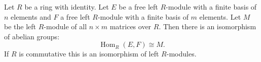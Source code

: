 Let $R$ be a ring with identity. Let $E$ be a free left $R$-module with a finite basis of $n$ elements and $F$ a free left $R$-module with a finite basis of $m$ elements. Let $M$ be the left $R$-module of all $n \times m$ matrices over $R$. Then there is an isomorphism of abelian groups:
\[
\operatorname{Hom}_R(E,F) \cong M.
\]
If $R$ is commutative this is an isomorphism of left $R$-modules.
